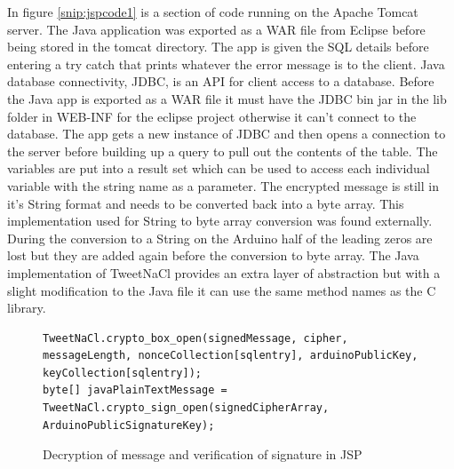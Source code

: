 In figure \ref{snip:jspcode1} is a section of code running on the Apache Tomcat server. The Java application was exported as a WAR file from Eclipse before being stored in the tomcat directory. The app is given the SQL details before entering a try catch that prints whatever the error message is to the client. Java database connectivity, JDBC, is an API for client access to a database. Before the Java app is exported as a WAR file it must have the JDBC bin jar in the lib folder in WEB-INF for the eclipse project otherwise it can't connect to the database\cite{jdbc}. The app gets a new instance of JDBC and then opens a connection to the server before building up a query to pull out the contents of the table. The variables are put into a result set which can be used to access each individual variable with the string name as a parameter. The encrypted message is still in it's String format and needs to be converted back into a byte array. This implementation used for String to byte array conversion was found externally\cite{byte2}. During the conversion to a String on the Arduino half of the leading zeros are lost but they are added again before the conversion to byte array. The Java implementation of TweetNaCl provides an extra layer of abstraction but with a slight modification to the Java file it can use the same method names as the C library.

\begin{figure}[H]
\begin{lstlisting}[style=Java]
TweetNaCl.crypto_box_open(signedMessage, cipher, messageLength, nonceCollection[sqlentry], arduinoPublicKey, keyCollection[sqlentry]);
byte[] javaPlainTextMessage = TweetNaCl.crypto_sign_open(signedCipherArray, ArduinoPublicSignatureKey);
\end{lstlisting}
\caption{Decryption of message and verification of signature in JSP}
\label{snip:decryptjsp}
\end{figure}

